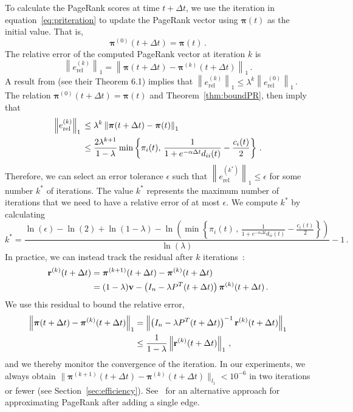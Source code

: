\documentclass[journal,transmag]{IEEEtran}
\newcommand{\mat}[1]{\mathbf{#1}}
\newcommand{\gvec}[1]{\bm{#1}}
\newcommand{\vecb}[1]{\mathbf{#1}}
\newcommand{\norm}[1]{\left\| #1 \right\|}
\newcommand{\tdt}{t+\Delta t}
\newcommand{\vpi}{\gvec{\pi}}
\begin{document}
To calculate the PageRank scores at time $\tdt$, we use the iteration
in equation~\eqref{eq:priteration} to update the PageRank vector using
$\vpi(t)$ as the initial value. That is,
\begin{equation} 
	\vpi^{\left(0\right)}(\tdt) =  \vpi(t)\,.
\end{equation}
The relative error of the computed PageRank vector at iteration $k$ is
\begin{equation} \label{def:rel_error_k}
  \norm{e_{\mathrm{rel}}^{\left(k\right)}}_1 = \norm{\vpi(\tdt) -
    \vpi^{\left(k\right)}(\tdt)}_1\,.
\end{equation} 
A result from \cite{Bianchini2005} (see their Theorem 6.1) implies that
$\norm{e_{\mathrm{rel}}^{\left(k\right)}}_1 \leq
\lambda^{k}\norm{e_{\mathrm{rel}}^{\left(0\right)}}_1\,$. 
The relation $\vpi^{\left(0\right)}(\tdt) = \vpi(t)$ and Theorem~\ref{thm:boundPR},
then imply that
\begin{align} \label{eq:rel_error_k}
          	\norm{e_{\mathrm{rel}}^{\left(k\right)}}_1\, & \leq \lambda^k
          \norm{\vpi(\tdt)-\vpi(t)}_1 \notag \\ 
          	&\leq \frac{2\lambda^{k+1}}{1-\lambda} \min \left\lbrace
          \pi_{i}(t), \, \frac{1}{1+e^{-\alpha \Delta t}d_{ii}(t)} -
          \frac{c_i(t)}{2} \right\rbrace\,. 
\end{align}
Therefore, we can select an error tolerance $\epsilon$ such that
$\norm{e_{\mathrm{rel}}^{\left(k^{*}\right)}}_1 \leq \epsilon$ for
some number $k^*$ of iterations. The value $k^*$ represents the
maximum number of iterations that we need to have
a relative error of at most $\epsilon$. We compute $k^*$ by calculating
{\tiny
\begin{equation}
  k^* = \frac{\ln(\epsilon) - \ln(2) + \ln(1-\lambda)
    - \ln\left(\min \left\lbrace \pi_{i}(t)\,, \,
    \frac{1}{1+e^{-\alpha \Delta t}d_{ii}(t)} - \frac{c_i(t)}{2}
    \right\rbrace \right)}{\ln(\lambda)} -1 \,.
\end{equation}}
In practice, we can instead track the residual after $k$
iterations~\cite{Gleich2015}:
\begin{align}
  \mat{r}^{\left(k\right)}(\tdt) &=
  \vpi^{\left(k+1\right)}(\tdt)-\vpi^{\left(k\right)}(\tdt) \notag
  \\ &= (1-\lambda)\vecb{v} - \left(I_n - \lambda
  P^T(\tdt)\right)\vpi^{\left(k\right)}(\tdt)\,.
\end{align}
We use this residual to bound the relative error, 
{\tiny
\begin{align}
  \norm{\vpi(\tdt) - \vpi^{\left(k\right)}(\tdt)}_1 &= \norm{
    \left(I_n - \lambda
    P^T(\tdt)\right)^{-1}\mat{r}^{\left(k\right)}(\tdt)}_1 \notag
  \\ &\leq
  \frac{1}{1-\lambda}\norm{\mat{r}^{\left(k\right)}(\tdt)}_1\,,
\end{align}}
and we thereby monitor the convergence of the iteration. In our
experiments, we always obtain $\|\vpi^{\left(k+1\right)}(\tdt) -
\vpi^{\left(k\right)}(\tdt)\|_{l_1} <10^{-6}$ in two iterations or
fewer (see Section~\ref{sec:efficiency}). See~\cite{chien2004} for an
alternative approach for approximating PageRank after adding a single edge.
\end{document}
